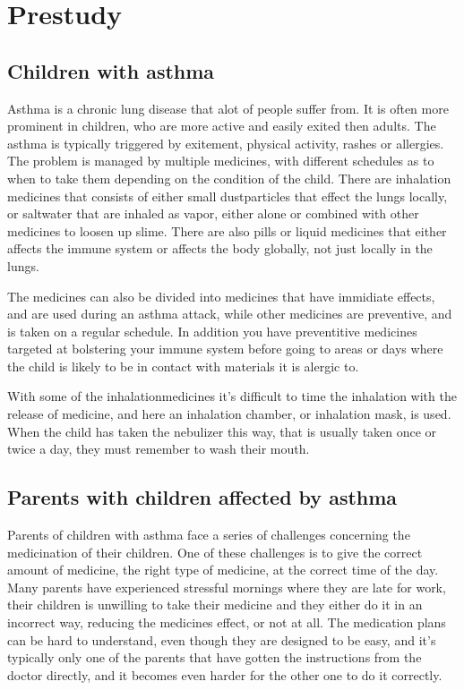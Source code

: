 \chapter{Prestudy}
\label{chap:prestudy}
\section{Children with asthma}
Asthma is a chronic lung disease that alot of people suffer from. It is often more prominent in children, who are more active and easily exited then
adults. The asthma is typically triggered by exitement, physical activity, rashes or allergies. The problem is managed by multiple medicines, 
with different schedules as to when to take them depending on the condition of the child. There are inhalation medicines that consists of either 
small dustparticles that effect the lungs locally, or saltwater that are inhaled as vapor, either alone or combined with other medicines to loosen 
up slime. There are also pills or liquid medicines that either affects the immune system or affects the body globally, not just locally in the lungs.

The medicines can also be divided into medicines that have immidiate effects, and are used during an asthma attack, while other medicines are preventive, 
and is taken on a regular schedule. In addition you have preventitive medicines targeted at bolstering your immune system before going to areas or days
where the child is likely to be in contact with materials it is alergic to.	

With some of the inhalationmedicines it's difficult to time the inhalation with the release of medicine, and here an inhalation chamber, or inhalation 
mask, is used. When the child has taken the nebulizer this way, that is usually taken once or twice a day, they must remember to wash their mouth. 

\section{Parents with children affected by asthma}

Parents of children with asthma face a series of challenges concerning the medicination of their children. 
One of these challenges is to give the correct amount of medicine, the right type of medicine, at the 
correct time of the day. Many parents have experienced stressful mornings where they are late for work, 
their children is unwilling to take their medicine and they either do it in an incorrect way, reducing the 
medicines effect, or not at all. The medication plans can be hard to understand, even though they are 
designed to be easy, and it's typically only one of the parents that have gotten the instructions from 
the doctor directly, and it becomes even harder for the other one to do it correctly.

